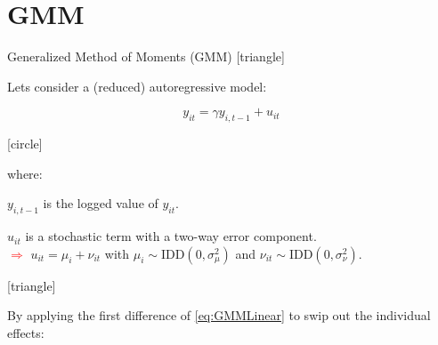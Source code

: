 \documentclass{beamer}
\begin{document}
\section{GMM}

\begin{frame}[label=GMM]{Generalized Method of Moments (GMM)}
\vspace{-32pt} \flushright \hyperlink{Bibliography2}{\beamerbutton{\textcolor{red}{Papers}}} \vspace{-32pt} \hyperlink{Mirror}{\beamerbutton{\textcolor{red}{Mirror}}}
[triangle]
\vspace{50pt}
\begin{itemize} 
{\scriptsize\item Lets consider a (reduced) autoregressive model:}
\end{itemize}

\vspace{-10pt}
\begin{equation} \label{eq:GMMLinear}
y_{it} = \gamma y_{i,t-1} + u_{it} 
\end{equation}


\vspace{-15pt}
[circle]
\begin{flushleft} \hspace{9pt}
{\scriptsize where:}
\end{flushleft}
\vspace{-10pt}
\begin{itemize}
{\scriptsize\item $y_{i,t-1}$ is the logged value of $y_{it}$.}
\vspace{-3pt}
{\scriptsize\item $u_{it}$ is a stochastic term with a two-way error component. \vspace{-6pt}
\\ \tiny\textcolor{red}{$\Longrightarrow$} $u_{it} =\mu_{i} + \nu_{it}$ with $\mu_{i} \sim \text{IDD}(0, \sigma^2_{\mu})$ and $\nu_{it} \sim \text{IDD}(0, \sigma^2_{\nu})$.}
\end{itemize}

[triangle]
\begin{itemize} 
{\scriptsize\item By applying the first difference of \eqref{eq:GMMLinear} to swip out the individual effects:}


\end{itemize}
\end{frame}
\end{document}
